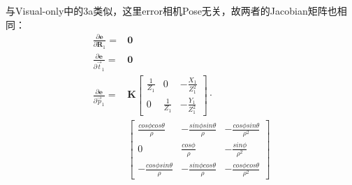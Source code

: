 \documentclass{article}
\begin{document}
与Visual-only中的3a类似，这里error相机Pose无关，故两者的Jacobian矩阵也相同：
\begin{equation}
	\begin{aligned}
		\frac {\partial{\boldsymbol{e}}}{\partial{\boldsymbol{R}_1}}  =&\boldsymbol{0} \\
		\frac {\partial{\boldsymbol{e}}}{\partial{\vec{t}_1}}         =&\boldsymbol{0} \\  
		\frac{\partial{\boldsymbol{e}}}{\partial{\vec{p}_1}}=&\boldsymbol K 
		\left[
		\begin{matrix}
		\frac{1}{Z_1}                   & 0                               & -\frac{X_1}{Z_1^2}                \\
		0                               & \frac{1}{Z_1}                   & -\frac{Y_1}{Z_1^2}                
		\end{matrix}
		\right] \cdot \\&
		\left[
		\begin{matrix}
		\frac{cos\phi cos\theta}{\rho}  & -\frac{sin\phi sin\theta}{\rho} & -\frac{cos\phi sin\theta}{\rho^2} \\
		0                               & \frac{cos\phi}{\rho}            & -\frac{sin\phi}{\rho^2}           \\
		-\frac{cos\phi sin\theta}{\rho} & -\frac{sin\phi cos\theta}{\rho} & -\frac{cos\phi cos\theta}{\rho^2} 
		\end{matrix}
		\right] 
	\end{aligned}
\end{equation}
\end{document}
